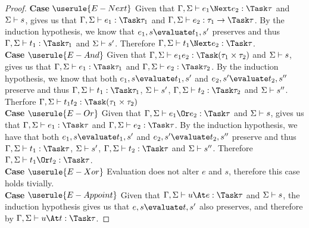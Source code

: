 \begin{proof}
  \noindent\textbf{Case} $\userule{E-Next}$
      Given that $\Gamma,\Sigma\infers e_1\Next e_2:\Task \tau$ and
      $\Sigma\vdash s$,  gives us that
      $\Gamma,\Sigma\infers e_1:\Task\tau_1$ and
      $\Gamma,\Sigma\infers e_2:\tau_1 \to \Task \tau$. By the induction
      hypothesis, we know that $e_1,s\evaluate t_1,s'$ preserves and thus
      $\Gamma,\Sigma\infers t_1:\Task\tau_1$ and $\Sigma\vdash s'$. Therefore
      $\Gamma,\Sigma\infers t_1\Next e_2:\Task\tau$.\\

  \noindent\textbf{Case} $\userule{E-And}$
      Given that $\Gamma,\Sigma\infers e_1\And e_2:\Task(\tau_1\times\tau_2)$
      and $\Sigma\vdash s$,  gives us that
      $\Gamma,\Sigma\infers e_1:\Task\tau_1$ and
      $\Gamma,\Sigma\infers e_2:\Task\tau_2$. By the induction hypothesis, we
      know that both $e_1,s\evaluate t_1,s'$ and $e_2,s'\evaluate t_2,s''$
      preserve and thus $\Gamma,\Sigma\infers t_1:\Task\tau_1$,
      $\Sigma\vdash s'$, $\Gamma,\Sigma\infers t_2:\Task\tau_2$ and
      $\Sigma\vdash s''$. Therfore
      $\Gamma,\Sigma\infers t_1\And t_2:\Task(\tau_1\times\tau_2)$\\

  \noindent\textbf{Case} $\userule{E-Or}$
      Given that $\Gamma,\Sigma\infers e_1\Or e_2:\Task\tau$ and $\Sigma\vdash s$,  gives us that $\Gamma,\Sigma\infers e_1:\Task\tau$ and
      $\Gamma,\Sigma\infers e_2:\Task\tau$. By the induction hypothesis, we have that both
      $e_1,s\evaluate t_1,s'$ and $e_2,s'\evaluate t_2,s''$ preserve and thus $\Gamma,\Sigma\infers t_1:\Task\tau$, $\Sigma\vdash s'$,
      $\Gamma,\Sigma\infers t_2:\Task\tau$ and $\Sigma\vdash s''$. Therefore $\Gamma,\Sigma\infers t_1\Or t_2:\Task\tau$.\\

  \noindent\textbf{Case} $\userule{E-Xor}$
      Evaluation does not alter $e$ and $s$, therefore this case holds tivially.\\

  \noindent\textbf{Case} $\userule{E-Appoint}$
      Given that $\Gamma,\Sigma\infers u \At e:\Task\tau$ and $\Sigma\vdash s$, the induction hypothesis gives us that $e,s\evaluate t,s'$ also preserves, and therefore by  $\Gamma,\Sigma\infers u \At t:\Task\tau$.
\end{proof}



